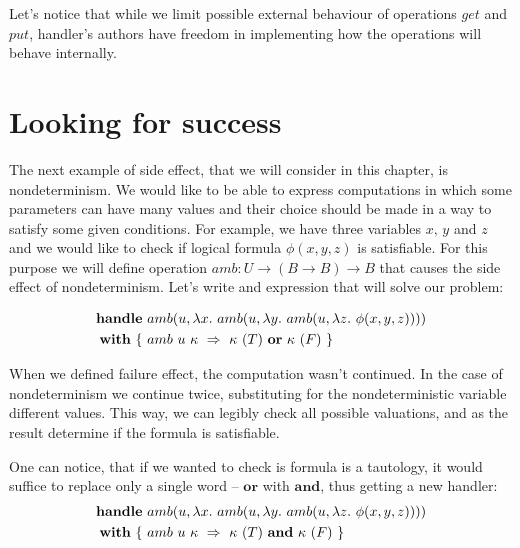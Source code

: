 Let's notice that while we limit possible external behaviour of operations \(get\) and \(put\), handler's authors have freedom in implementing how the operations will behave internally.


\section{Looking for success}

The next example of side effect, that we will consider in this chapter, is nondeterminism. We would like to be able to express computations in which some parameters can have many values and their choice should be made in a way to satisfy some given conditions. For example, we have three variables \(x,\, y\) and \(z\) and we would like to check if logical formula \(\phi(x, y, z)\) is satisfiable. For this purpose we will define operation \(amb: U \rightarrow (B \rightarrow B) \rightarrow B\) that causes the side effect of nondeterminism. Let's write and expression that will solve our problem:

\begin{equation}\begin{split}
  \handle{
    &\op{amb}{u}{\fun{x}{
        \op{amb}{u}{\fun{y}{
            \op{amb}{u}{\fun{z}{
                \phi(x, y, z)
            }}
        }}
    }}\\
  }{ \{ \ &\hcase{amb}{u\ \kappa}{ \kappa\ (T) \ \mathbf{or} \ \kappa\ (F) } \ \} }
\end{split}\end{equation}

When we defined failure effect, the computation wasn't continued. In the case of nondeterminism we continue twice, substituting for the nondeterministic variable different values. This way, we can legibly check all possible valuations, and as the result determine if the formula is satisfiable.

One can notice, that if we wanted to check is formula is a tautology, it would suffice to replace only a single word -- \(\mathbf{or}\) with \(\mathbf{and}\), thus getting a new handler:
\begin{equation}\begin{split}
  \handle{
    &\op{amb}{u}{\fun{x}{
        \op{amb}{u}{\fun{y}{
            \op{amb}{u}{\fun{z}{
                \phi(x, y, z)
            }}
        }}
    }}\\
  }{ \{ \ &\hcase{amb}{u\ \kappa}{ \kappa\ (T) \ \mathbf{and} \ \kappa\ (F) } \ \} }
\end{split}\end{equation}

